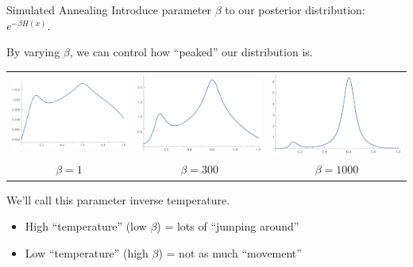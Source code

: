 \documentclass[10pt]{beamer}
\begin{document}
\begin{frame}{Simulated Annealing}
\vspace{1ex}
Introduce parameter $\beta$ to our posterior distribution: $e^{-\beta H(x)}$.

By varying $\beta$, we can control how ``peaked'' our distribution is.
\\[4ex]

\pause

\begin{center}
\begin{tabular}{ccc}
\includegraphics[width=0.3\linewidth]{img/anneal-beta1} &
\includegraphics[width=0.3\linewidth]{img/anneal-beta300} &
\includegraphics[width=0.3\linewidth]{img/anneal-beta1000} \\
$\beta = 1$ & $\beta = 300$ & $\beta = 1000$
\end{tabular}
\end{center}

\pause

We'll call this parameter inverse temperature.
\begin{itemize}
\item High ``temperature'' (low $\beta$) = lots of ``jumping around''
\item Low ``temperature'' (high $\beta$) = not as much ``movement''
\end{itemize}
\end{frame}
\end{document}
